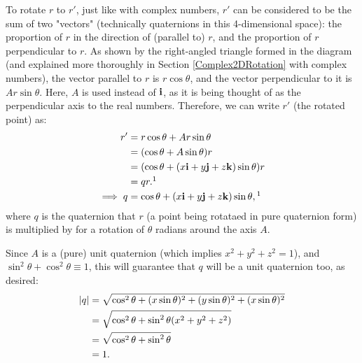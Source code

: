 \documentclass[10pt]{article}
\begin{document}
To rotate $r$ to $r'$, just like with complex numbers, $r'$ can be considered to be the sum of two "vectors" (technically quaternions in this 4-dimensional space): the proportion of $r$ in the direction of (parallel to) $r$, and the proportion of $r$ perpendicular to $r$. As shown by the right-angled triangle formed in the diagram (and explained more thoroughly in Section \ref{Complex2DRotation} with complex numbers), the vector parallel to $r$ is $r\cos\theta$, and the vector perpendicular to it is $Ar\sin\theta$. Here, $A$ is used instead of $\vb{i}$, as it is being thought of as the perpendicular axis to the real numbers. Therefore, we can write $r'$ (the rotated point) as:
\begin{equation}
    \begin{aligned}
        r' &= r\cos\theta + Ar\sin\theta \\
           &= (\cos\theta + A\sin\theta)r \\
           &= (\cos\theta + (x\vb{i} + y\vb{j} + z\vb{k})\sin\theta)r \\
           &= qr. \footnotemark[1] \\
        \implies q &= \cos\theta + (x\vb{i} + y\vb{j} + z\vb{k})\sin\theta,\footnotemark[1]
    \end{aligned}
\end{equation}
where $q$ is the quaternion that $r$ (a point being rotataed in pure quaternion form) is multiplied by for a rotation of $\theta$ radians around the axis $A$.

Since $A$ is a (pure) unit quaternion (which implies $x^2 + y^2 + z^2 = 1$), and $\sin^2\theta + \cos^2\theta \equiv 1$, this will guarantee that $q$ will be a unit quaternion too, as desired:
\begin{equation}
    \begin{aligned}
        \abs{q} &= \sqrt{\cos^2\theta + (x\sin\theta)^2 + (y\sin\theta)^2 + (x\sin\theta)^2} \\
                &= \sqrt{\cos^2\theta + \sin^2\theta(x^2 + y^2 + z^2)} \\
                &= \sqrt{\cos^2\theta + \sin^2\theta} \\
                &= 1.
    \end{aligned}
\end{equation}
\end{document}
